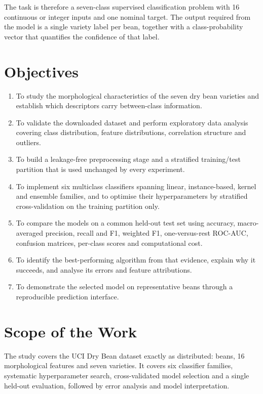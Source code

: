 The task is therefore a seven-class supervised classification problem with 16
continuous or integer inputs and one nominal target. The output required from the
model is a single variety label per bean, together with a class-probability
vector that quantifies the confidence of that label.

\section{Objectives}

\begin{enumerate}[label=\arabic*.]
  \item To study the morphological characteristics of the seven dry bean
        varieties and establish which descriptors carry between-class
        information.
  \item To validate the downloaded dataset and perform exploratory data analysis
        covering class distribution, feature distributions, correlation
        structure and outliers.
  \item To build a leakage-free preprocessing stage and a stratified
        training/test partition that is used unchanged by every experiment.
  \item To implement six multiclass classifiers spanning linear, instance-based,
        kernel and ensemble families, and to optimise their hyperparameters by
        stratified cross-validation on the training partition only.
  \item To compare the models on a common held-out test set using accuracy,
        macro-averaged precision, recall and F1, weighted F1, one-versus-rest
        ROC-AUC, confusion matrices, per-class scores and computational cost.
  \item To identify the best-performing algorithm from that evidence, explain
        why it succeeds, and analyse its errors and feature attributions.
  \item To demonstrate the selected model on representative beans through a
        reproducible prediction interface.
\end{enumerate}

\section{Scope of the Work}

The study covers the UCI Dry Bean dataset exactly as distributed: \DatasetRows{}
beans, 16 morphological features and seven varieties. It covers six classifier
families, systematic hyperparameter search, cross-validated model selection and a
single held-out evaluation, followed by error analysis and model interpretation.

